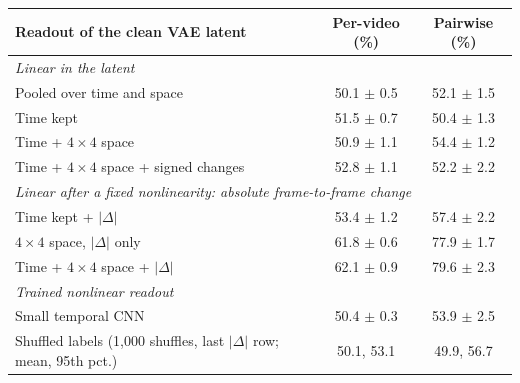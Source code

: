 \begin{tabular}{lcc}
\toprule
Readout of the clean VAE latent & Per-video (\%) & Pairwise (\%) \\
\midrule
\multicolumn{3}{l}{\emph{Linear in the latent}} \\
\quad Pooled over time and space & 50.1 $\pm$ 0.5 & 52.1 $\pm$ 1.5 \\
\quad Time kept & 51.5 $\pm$ 0.7 & 50.4 $\pm$ 1.3 \\
\quad Time + $4{\times}4$ space & 50.9 $\pm$ 1.1 & 54.4 $\pm$ 1.2 \\
\quad Time + $4{\times}4$ space + signed changes & 52.8 $\pm$ 1.1 & 52.2 $\pm$ 2.2 \\
\multicolumn{3}{l}{\emph{Linear after a fixed nonlinearity: absolute frame-to-frame change}} \\
\quad Time kept + $|\Delta|$ & 53.4 $\pm$ 1.2 & 57.4 $\pm$ 2.2 \\
\quad $4{\times}4$ space, $|\Delta|$ only & 61.8 $\pm$ 0.6 & 77.9 $\pm$ 1.7 \\
\quad Time + $4{\times}4$ space + $|\Delta|$ & 62.1 $\pm$ 0.9 & 79.6 $\pm$ 2.3 \\
\multicolumn{3}{l}{\emph{Trained nonlinear readout}} \\
\quad Small temporal CNN & 50.4 $\pm$ 0.3 & 53.9 $\pm$ 2.5 \\
\midrule
Shuffled labels (1,000 shuffles, last $|\Delta|$ row; mean, 95th pct.) & 50.1, 53.1 & 49.9, 56.7 \\
\bottomrule
\end{tabular}
